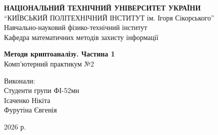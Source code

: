 \pagestyle{empty}

\begin{titlepage}
    \begin{center}

        \textbf{НАЦІОНАЛЬНИЙ ТЕХНІЧНИЙ УНІВЕРСИТЕТ УКРАЇНИ}\\
        “КИЇВСЬКИЙ ПОЛІТЕХНІЧНИЙ ІНСТИТУТ ім. Ігоря Сікорського”\\
        Навчально-науковий фізико-технічний інститут\\
        Кафедра математичних методів захисту інформації

        \vspace{6cm}

        \Large \textbf{Методи криптоаналізу. Частина 1}\\
        Комп'ютерний практикум №2\\

    \end{center}

    \vspace{10cm}
    \begin{flushright}
        Виконали:\\
        Студенти групи ФІ-52мн\\
        Ісаченко Нікіта\\
        Фурутіна Євгенія
    \end{flushright}

    \vspace*{2.5cm}

    \begin{center}
        2026 р.
    \end{center}
\end{titlepage}